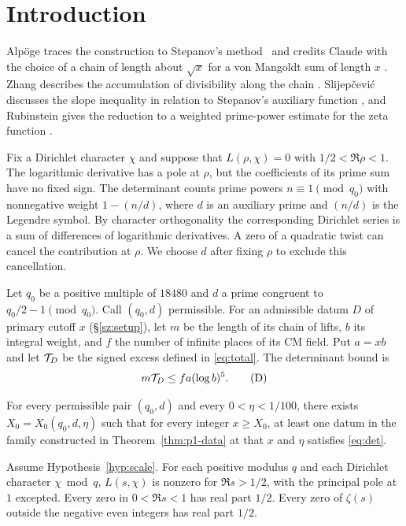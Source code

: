 \section{Introduction}\label{sec:p1intro}
Alp\"oge traces the construction to Stepanov's method~\cite{stepanov} and credits Claude with the choice of a chain of length about \(\sqrt{x}\) for a von Mangoldt sum of length \(x\) \cite{alpo}. Zhang describes the accumulation of divisibility along the chain \cite{zhang}. Slijep\v{c}evi\'c discusses the slope inequality in relation to Stepanov's auxiliary function \cite{slijepcevic}, and Rubinstein gives the reduction to a weighted prime-power estimate for the zeta function \cite{rubinstein}.

Fix a Dirichlet character \(\chi\) and suppose that \(L(\rho,\chi)=0\) with \(1/2<\Re\rho<1\).
The logarithmic derivative has a pole at \(\rho\), but the coefficients of its prime sum have no fixed sign.
The determinant counts prime powers \(n\equiv1\pmod{q_0}\) with nonnegative weight \(1-(n/d)\), where \(d\) is an auxiliary prime and \((n/d)\) is the Legendre symbol.
By character orthogonality the corresponding Dirichlet series is a sum of differences of logarithmic derivatives.
A zero of a quadratic twist can cancel the contribution at \(\rho\). We choose \(d\) after fixing \(\rho\) to exclude this cancellation.

Let \(q_0\) be a positive multiple of \(18480\) and \(d\) a prime congruent to \(q_0/2-1\pmod{q_0}\). Call \((q_0,d)\) permissible.
For an admissible datum \(D\) of primary cutoff \(x\) (\S\ref{sz:setup}), let \(m\) be the length of its chain of lifts, \(b\) its integral weight, and \(f\) the number of infinite places of its CM field. Put \(a=xb\) and let \(\mathcal T_D\) be the signed excess defined in \eqref{eq:total}. The determinant bound is
\begin{equation}
                m\mathcal T_D\le fa(\log b)^5. \tag{D}\label{eq:det}
\end{equation}

\begin{scalehypothesis}\label{hyp:scale}
For every permissible pair \((q_0,d)\) and every \(0<\eta<1/100\), there exists \(X_0=X_0(q_0,d,\eta)\) such that for every integer \(x\ge X_0\), at least one datum in the family constructed in Theorem~\ref{thm:p1-data} at that \(x\) and \(\eta\) satisfies \eqref{eq:det}.
\end{scalehypothesis}

\begin{theorem}\label{thm:main}
Assume Hypothesis~\ref{hyp:scale}. For each positive modulus \(q\) and each Dirichlet character \(\chi\bmod q\), \(L(s,\chi)\) is nonzero for \(\Re s>1/2\), with the principal pole at \(1\) excepted. Every zero in \(0<\Re s<1\) has real part \(1/2\). Every zero of \(\zeta(s)\) outside the negative even integers has real part \(1/2\).
\end{theorem}

